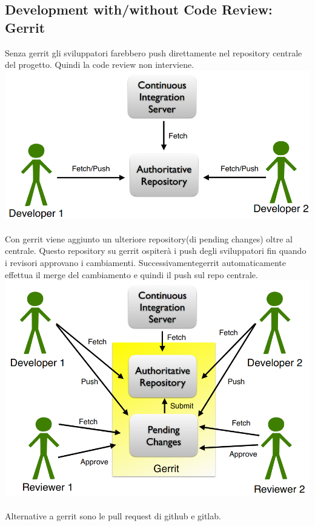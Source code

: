 \documentclass[10pt,a4paper]{book}
\begin{document}
\subsection{Development with/without Code Review: Gerrit}
Senza gerrit gli sviluppatori farebbero push direttamente nel repository centrale del progetto. Quindi la code review non interviene.\\
\includegraphics[scale=1]{nocoder.png} \\ \\

Con gerrit viene aggiunto un ulteriore repository(di pending changes) oltre al centrale.
Questo repository su gerrit ospiterà i push degli sviluppatori fin quando i revisori approvano i cambiamenti. Successivamentegerrit automaticamente effettua il merge del cambiamento e quindi il push sul repo centrale.\\
\includegraphics[scale=1]{coder.png} \\ \\

Alternative a gerrit sono le pull request di github e gitlab.
\end{document}
